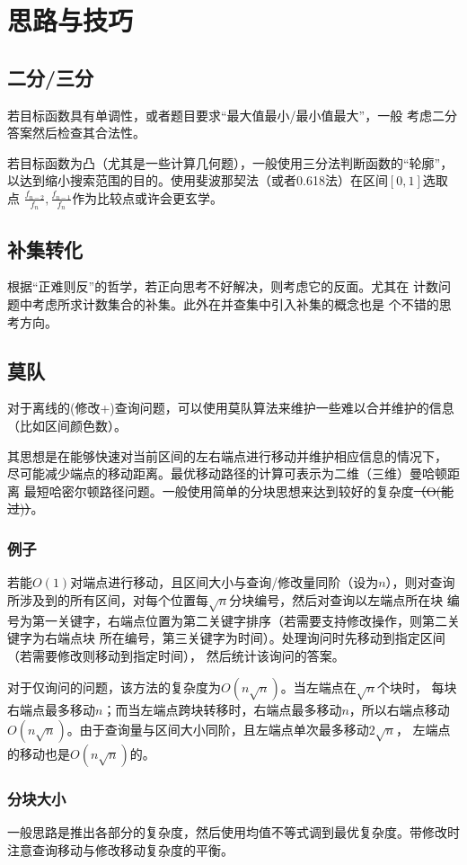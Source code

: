 \section{思路与技巧}
\subsection{二分/三分}
若目标函数具有单调性，或者题目要求``最大值最小/最小值最大''，一般
考虑二分答案然后检查其合法性。

若目标函数为凸（尤其是一些计算几何题），一般使用三分法判断函数的``轮廓''，
以达到缩小搜索范围的目的。使用斐波那契法（或者0.618法）在区间$[0,1]$选取点
$\frac{f_{n-2}}{f_n},\frac{f_{n-1}}{f_n}$作为比较点或许会更玄学。
\subsection{补集转化}
根据``正难则反''的哲学，若正向思考不好解决，则考虑它的反面。尤其在
计数问题中考虑所求计数集合的补集。此外在并查集中引入补集的概念也是
个不错的思考方向。
\subsection{莫队}
对于离线的(修改+)查询问题，可以使用莫队算法来维护一些难以合并维护的信息
（比如区间颜色数）。

其思想是在能够快速对当前区间的左右端点进行移动并维护相应信息的情况下，
尽可能减少端点的移动距离。最优移动路径的计算可表示为二维（三维）曼哈顿距离
最短哈密尔顿路径问题。一般使用简单的分块思想来达到较好的复杂度\sout{（O(能过)）}。

\subsubsection{例子}
若能$O(1)$对端点进行移动，且区间大小与查询/修改量同阶（设为$n$），则对查询
所涉及到的所有区间，对每个位置每$\sqrt{n}$分块编号，然后对查询以左端点所在块
编号为第一关键字，右端点位置为第二关键字排序（若需要支持修改操作，则第二关键字为右端点块
所在编号，第三关键字为时间）。处理询问时先移动到指定区间（若需要修改则移动到指定时间），
然后统计该询问的答案。

对于仅询问的问题，该方法的复杂度为$O(n\sqrt{n})$。当左端点在$\sqrt{n}$个块时，
每块右端点最多移动$n$；而当左端点跨块转移时，右端点最多移动$n$，所以右端点移动
$O(n\sqrt{n})$。由于查询量与区间大小同阶，且左端点单次最多移动$2\sqrt{n}$，
左端点的移动也是$O(n\sqrt{n})$的。
\subsubsection{分块大小}
一般思路是推出各部分的复杂度，然后使用均值不等式调到最优复杂度。带修改时
注意查询移动与修改移动复杂度的平衡。
